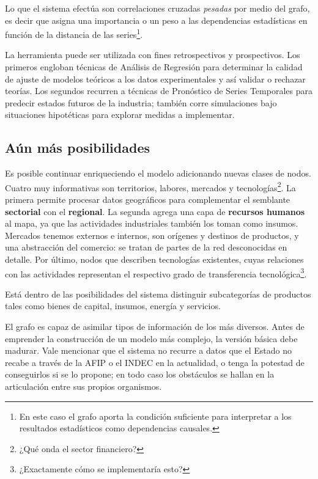\documentclass[a4paper]{report}
\begin{document}
Lo que el sistema efectúa son correlaciones cruzadas \textit{pesadas} por medio del grafo, es decir que asigna una importancia o un peso a las dependencias estadísticas en función de la distancia de las series\footnote{En este caso el grafo aporta la condición suficiente para interpretar a los resultados estadísticos como dependencias causales.}.

La herramienta puede ser utilizada con fines retrospectivos y prospectivos. Los primeros engloban técnicas de Análisis de Regresión para determinar la calidad de ajuste de modelos teóricos a los datos experimentales y así validar o rechazar teorías. Los segundos recurren a técnicas de Pronóstico de Series Temporales para predecir estados futuros de la industria; también corre simulaciones bajo situaciones hipotéticas para explorar medidas a implementar.

\subsection*{Aún más posibilidades}

Es posible continuar enriqueciendo el modelo adicionando nuevas clases de nodos. Cuatro muy informativas son territorios, labores, mercados y tecnologías\footnote{¿Qué onda el sector financiero?}. La primera permite procesar datos geográficos para complementar el semblante \textbf{sectorial} con el \textbf{regional}. La segunda agrega una capa de \textbf{recursos humanos} al mapa, ya que las actividades industriales también los toman como insumos. Mercados tenemos externos e internos, son orígenes y destinos de productos, y una abstracción del comercio: se tratan de partes de la red desconocidas en detalle. Por último, nodos que describen tecnologías existentes, cuyas relaciones con las actividades representan el respectivo grado de transferencia tecnológica\footnote{¿Exactamente cómo se implementaría esto?}.

Está dentro de las posibilidades del sistema distinguir subcategorías de productos tales como bienes de capital, insumos, energía y servicios.

El grafo es capaz de asimilar tipos de información de los más diversos. Antes de emprender la construcción de un modelo más complejo, la versión básica debe madurar. Vale mencionar que el sistema no recurre a datos que el Estado no recabe a través de la AFIP o el INDEC en la actualidad, o tenga la potestad de conseguirlos si se lo propone; en todo caso los obstáculos se hallan en la articulación entre sus propios organismos.
\end{document}
